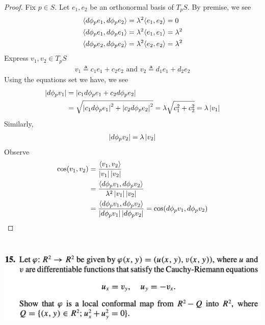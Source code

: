 \documentclass{report}
\begin{document}
\begin{proof}
Fix $p\in  S$. Let $e_1,e_2$ be an orthonormal basis of  $T_pS$. By premise, we see 
 \begin{align*}
\langle d\phi_p e_1,d\phi_pe_2\rangle &= \lambda ^2 \langle e_1,e_2\rangle =0\\
\langle d\phi_p e_1,d\phi_p e_1\rangle &=\lambda ^2\langle e_1,e_1\rangle =\lambda ^2\\
\langle d\phi_p e_2,d\phi_p e_2\rangle &=\lambda ^2\langle e_2,e_2\rangle = \lambda ^2
\end{align*}
Express $v_1,v_2\in T_pS$ 
\begin{align*}
v_1\triangleq c_1e_1+c_2e_2\text{ and }v_2\triangleq d_1e_1+d_2e_2
\end{align*}
Using the equations set we have, we see
\begin{align*}
\left|d\phi_p v_1\right|&= \left|c_1 d\phi_p e_1+ c_2d\phi_p e_2\right|\\
                  &=\sqrt{ \left|c_1d\phi_p e_1\right|^2+ \left|c_2d\phi_p e_2\right|^2}= \lambda  \sqrt{c_1^2+ c_2^2}=\lambda \left|v_1\right| 
\end{align*}
Similarly, 
\begin{align*}
\left|d\phi_p v_2\right|=\lambda \left|v_2\right|
\end{align*}
Observe 
\begin{align*}
\cos (v_1,v_2)&=\frac{\langle v_1,v_2 \rangle }{\left|v_1\right|\left|v_2\right|}\\
&=\frac{\langle d\phi_p v_1, d\phi_p v_2\rangle }{\lambda ^2\left|v_1\right|\left|v_2\right|}\\
&=\frac{\langle d\phi_p v_1,d\phi_p v_2\rangle }{\left|d\phi_p v_1\right|\left|d\phi_p v_2\right|}= \cos (d\phi_p v_1, d\phi_p v_2)
\end{align*}
\end{proof}
\begin{question}{}{}
\includegraphics[height=5cm,width=18cm]{hw67}
\end{question}
\end{document}
